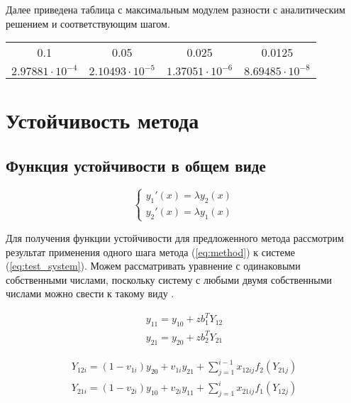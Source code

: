 \documentclass[a4paper,article,14pt]{extarticle}
\begin{document}
Далее приведена таблица с максимальным модулем разности с аналитическим решением и соответствующим шагом.
\begin{center}
\begin{tabular}{ |c|c|c|c| } 
\hline
0.1& 0.05 & 0.025 & 0.0125 \\ 
$2.97881\cdot10^{-4}$ & $2.10493\cdot10^{-5}$ & $1.37051\cdot10^{-6}$ & $8.69485\cdot10^{-8}$ \\ 
\hline
\end{tabular}
\end{center}
\pagebreak

\section{Устойчивость метода}
\subsection{Функция устойчивости в общем виде}
\begin{equation}
\begin{cases}
    y_{1}'(x) = \lambda y_{2}(x) \\
    y_{2}'(x) = \lambda y_{1}(x)
\end{cases}
\label{eq:test_system}
\end{equation}

Для получения функции устойчивости для предложенного метода рассмотрим результат применения одного шага метода (\ref{eq:method}) к системе (\ref{eq:test_system}). Можем рассматривать уравнение с одинаковыми собственными числами, поскольку систему с любыми двумя собственными числами можно свести к такому виду \cite{stability}.

\begin{equation}
\begin{aligned}
    y_{11} = y_{10} + z b_1^T Y_{12} \\
    y_{21} = y_{20} + z b_2^T Y_{21}
\end{aligned}    
\end{equation}

\begin{equation}
\begin{aligned}
    Y_{12i} = (1 - v_{1i}) y_{20} + v_{1i} y_{21} + \sum_{j=1}^{i-1} x_{12ij} f_{2} (Y_{21j}) \\
    Y_{21i} = (1 - v_{2i}) y_{10} + v_{2i} y_{11} + \sum_{j=1}^{i} x_{21ij} f_{1} (Y_{12j})
\end{aligned}
\end{equation}
\end{document}
